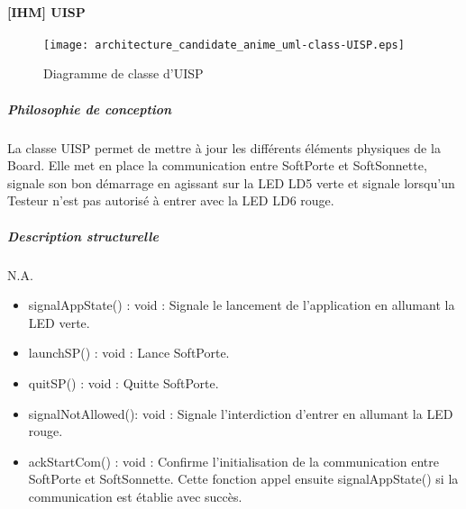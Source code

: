     \paragraph{[IHM] UISP}%
    \begin{figure} [H]
        \centering
        \texttt{[image: architecture\_candidate\_anime\_uml-class-UISP.eps]}
        \caption{Diagramme de classe d'UISP}
        \label{UISP}
    \end{figure}
        \subparagraph{Philosophie de conception}%
        La classe UISP permet de mettre à jour les différents éléments physiques de la Board.
        Elle met en place la communication entre SoftPorte et SoftSonnette, signale son bon démarrage en agissant sur la LED LD5 verte et signale lorsqu'un Testeur n'est pas autorisé à entrer avec la LED LD6 rouge.
        \subparagraph{Description structurelle}%
            N.A.
            \begin{itemize}
                \item {signalAppState() : void : Signale le lancement de l'application en allumant la LED verte.}
                \item {launchSP() : void : Lance SoftPorte.}
                \item {quitSP() : void : Quitte SoftPorte.}
                \item {signalNotAllowed(): void : Signale l'interdiction d'entrer en allumant la LED rouge.}
                \item {ackStartCom() : void : Confirme l'initialisation de la communication entre SoftPorte et SoftSonnette. 
                Cette fonction appel ensuite signalAppState() si la communication est établie avec succès.}
            \end{itemize}

\newpage

